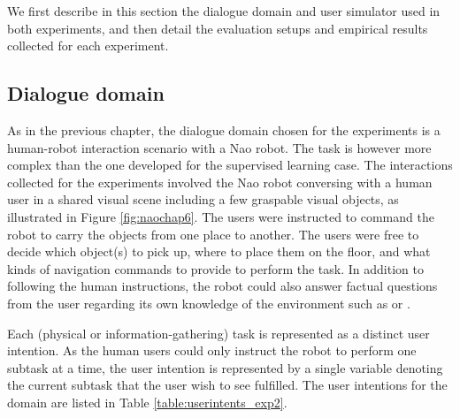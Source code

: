 We first describe in this section the dialogue domain and user simulator used in both experiments, and then detail the evaluation setups and empirical results collected for each experiment. 

\subsection{Dialogue domain}
\label{sec:exp2_dd}

As in the previous chapter, the dialogue domain chosen for the experiments is a human-robot interaction scenario with a Nao robot.  The task is however more complex than the one developed for the supervised learning case.  The interactions collected for the experiments involved the Nao robot conversing with a human user in a shared visual scene including a few graspable visual objects, as illustrated in Figure \ref{fig:naochap6}.  The users were instructed to command the robot to carry the objects from one place to another. The users were free to decide which object(s) to pick up, where to place them on the floor, and what kinds of navigation commands to provide to perform the task.  In addition to following the human instructions, the robot could also answer factual questions from the user regarding its own knowledge of the environment such as  or . 

Each (physical or information-gathering) task is represented as a distinct user intention. As the human users could only instruct the robot to perform one subtask at a time, the user intention is represented by a single variable denoting the current subtask that the user wish to see fulfilled.  The user intentions for the domain are listed in Table \ref{table:userintents_exp2}. 

